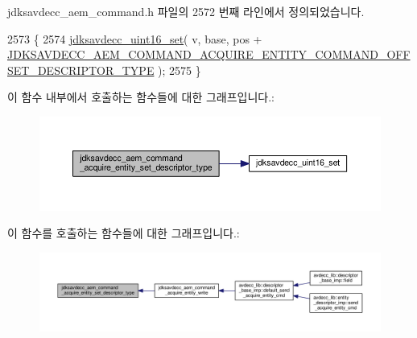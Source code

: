 jdksavdecc\+\_\+aem\+\_\+command.\+h 파일의 2572 번째 라인에서 정의되었습니다.


\begin{DoxyCode}
2573 \{
2574     \hyperlink{group__endian_ga14b9eeadc05f94334096c127c955a60b}{jdksavdecc\_uint16\_set}( v, base, pos + 
      \hyperlink{group__command__acquire__entity_gae192362bfd72c523d675a3ffb5347f77}{JDKSAVDECC\_AEM\_COMMAND\_ACQUIRE\_ENTITY\_COMMAND\_OFFSET\_DESCRIPTOR\_TYPE}
       );
2575 \}
\end{DoxyCode}


이 함수 내부에서 호출하는 함수들에 대한 그래프입니다.\+:
\nopagebreak
\begin{figure}[H]
\begin{center}
\leavevmode
\includegraphics[width=350pt]{group__command__acquire__entity_gafe85427400214c628dde618552b0a47f_cgraph}
\end{center}
\end{figure}




이 함수를 호출하는 함수들에 대한 그래프입니다.\+:
\nopagebreak
\begin{figure}[H]
\begin{center}
\leavevmode
\includegraphics[width=350pt]{group__command__acquire__entity_gafe85427400214c628dde618552b0a47f_icgraph}
\end{center}
\end{figure}


